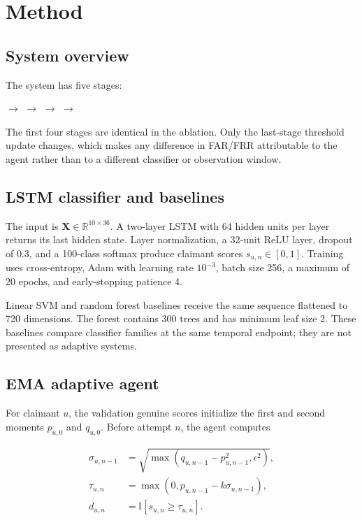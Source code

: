 \documentclass[3p,times,procedia]{elsarticle}
\begin{document}
\section{Method}
\label{sec:method}

\subsection{System overview}

The system has five stages:

\begin{center}
 $\rightarrow$
 $\rightarrow$
 $\rightarrow$
 $\rightarrow$
\end{center}

The first four stages are identical in the ablation. Only the last-stage
threshold update changes, which makes any difference in FAR/FRR attributable to
the agent rather than to a different classifier or observation window.

\subsection{LSTM classifier and baselines}

The input is $\mathbf{X}\in\mathbb{R}^{10\times36}$. A two-layer LSTM with 64
hidden units per layer returns its last hidden state. Layer normalization,
a 32-unit ReLU layer, dropout of 0.3, and a 100-class softmax produce claimant
scores $s_{u,n}\in[0,1]$. Training uses cross-entropy, Adam with learning rate
$10^{-3}$, batch size 256, a maximum of 20 epochs, and early-stopping patience 4.

Linear SVM and random forest baselines receive the same sequence flattened to
720 dimensions. The forest contains 300 trees and has minimum leaf size 2.
These baselines compare classifier families at the same temporal endpoint; they
are not presented as adaptive systems.

\subsection{EMA adaptive agent}

For claimant $u$, the validation genuine scores initialize the first and second
moments $p_{u,0}$ and $q_{u,0}$. Before attempt $n$, the agent computes

\begin{align}
\sigma_{u,n-1} &= \sqrt{\max(q_{u,n-1}-p_{u,n-1}^{2},\epsilon^2)},\\
\tau_{u,n} &= \max(0,p_{u,n-1}-k\sigma_{u,n-1}),\\
d_{u,n} &= \mathbb{I}[s_{u,n}\geq\tau_{u,n}].
\end{align}
\end{document}
